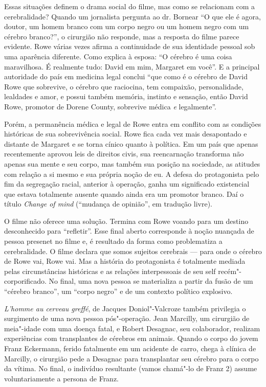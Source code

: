 Essas situações definem o drama social do filme, mas como se relacionam
com a cerebralidade? Quando um jornalista pergunta ao dr. Bornear ``O
que ele é agora, doutor, um homem branco com um corpo negro ou um homem
negro com um cérebro branco?'', o cirurgião não responde, mas a resposta
do filme parece evidente. Rowe várias vezes afirma a continuidade de sua
identidade pessoal sob uma aparência diferente. Como explica à esposa:
``O cérebro é uma coisa maravilhosa. É realmente tudo: David em mim,
Margaret em você''. E a principal autoridade do país em medicina legal
conclui ``que como é o cérebro de David Rowe que sobrevive, o cérebro
que raciocina, tem compaixão, personalidade, lealdades e amor, e possui
também memória, instinto e sensação, então David Rowe, promotor de
Dorene County, sobrevive médica \emph{e} legalmente''.

Porém, a permanência médica e legal de Rowe entra em conflito com as
condições históricas de sua sobrevivência social. Rowe fica cada vez
mais desapontado e distante de Margaret e se torna cínico quanto à
política. Em um país que apenas recentemente aprovou leis de direitos
civis, sua reencarnação transforma não apenas sua mente e seu corpo, mas
também sua posição na sociedade, as atitudes com relação a si mesmo e
sua própria noção de eu. A defesa do protagonista pelo fim da segregação
racial, anterior à operação, ganha um significado existencial que estava
totalmente ausente quando ainda era um promotor branco. Daí o título
\emph{Change of mind} (``mudança de opinião'', em tradução livre).

O filme não oferece uma solução. Termina com Rowe voando para um destino
desconhecido para ``refletir''. Esse final aberto corresponde à noção
nuançada de pessoa presenet no filme e, é resultado da forma como
problematiza a cerebralidade. O filme declara que somos sujeitos
cerebrais --- para onde o cérebro de Rowe vai, Rowe vai. Mas a história
do protagonista é totalmente mediada pelas circunstâncias históricas e
as relações interpessoais de seu self recém"-corporificado. No final, uma
nova pessoa se materializa a partir da fusão de um ``cérebro branco'',
um ``corpo negro'' e de um contexto político explosivo.

\emph{L'homme au cerveau greffé}, de Jacques Doniol"-Valcroze também
privilegia o surgimento de uma nova pessoa pós"-operação. Jean Marcilly,
um cirurgião de meia"-idade com uma doença fatal, e Robert Desagnac, seu
colaborador, realizam experiências com transplantes de cérebros em
animais. Quando o corpo do jovem Franz Eckermann, ferido fatalmente em
um acidente de carro, chega à clínica de Marcilly, o cirurgião pede a
Desagnac para transplantar seu cérebro para o corpo da vítima. No final,
o indivíduo resultante (vamos chamá"-lo de Franz 2) assume
voluntariamente a persona de Franz.

